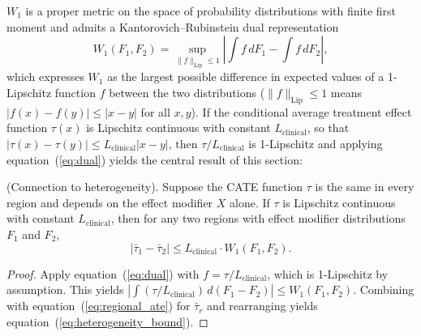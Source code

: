 \documentclass[AMA,Times1COL]{WileyNJDv5}
\begin{document}
$W_1$ is a proper metric on the space of probability distributions with finite first moment and admits a Kantorovich--Rubinstein dual representation\cite{panaretos2019}
\begin{equation}
W_1(F_1, F_2) = \sup_{\|f\|_{\text{Lip}} \leq 1} \left|\int f \, dF_1 - \int f \, dF_2\right|,
\label{eq:dual}
\end{equation}
which expresses $W_1$ as the largest possible difference in expected values of a 1-Lipschitz function $f$ between the two distributions ($\|f\|_{\text{Lip}} \leq 1$ means $|f(x) - f(y)| \leq |x - y|$ for all $x, y$). If the conditional average treatment effect function $\tau(x)$ is Lipschitz continuous with constant $L_{\text{clinical}}$, so that $|\tau(x) - \tau(y)| \leq L_{\text{clinical}} |x - y|$, then $\tau / L_{\text{clinical}}$ is 1-Lipschitz and applying equation~(\ref{eq:dual}) yields the central result of this section:

\begin{proposition}\label{prop:heterogeneity}
\textup{(Connection to heterogeneity).} Suppose the CATE function $\tau$ is the same in every region and depends on the effect modifier $X$ alone. If $\tau$ is Lipschitz continuous with constant $L_{\text{clinical}}$, then for any two regions with effect modifier distributions $F_1$ and $F_2$,
\begin{equation}
|\bar{\tau}_1 - \bar{\tau}_2| \leq L_{\text{clinical}} \cdot W_1(F_1, F_2).
\label{eq:heterogeneity_bound}
\end{equation}
\end{proposition}

\begin{proof}
Apply equation~(\ref{eq:dual}) with $f = \tau / L_{\text{clinical}}$, which is 1-Lipschitz by assumption. This yields $\left|\int (\tau / L_{\text{clinical}}) \, d(F_1 - F_2)\right| \leq W_1(F_1, F_2)$. Combining with equation~(\ref{eq:regional_ate}) for $\bar{\tau}_r$ and rearranging yields equation~(\ref{eq:heterogeneity_bound}).
\end{proof}
\end{document}
